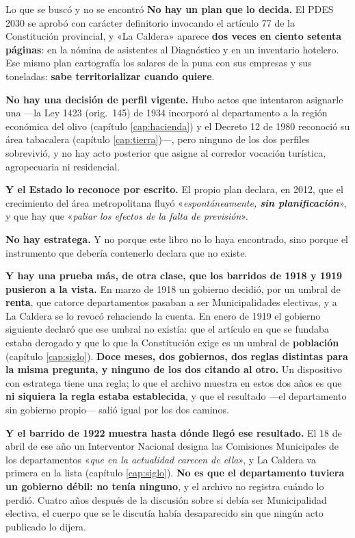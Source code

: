 \begin{ficha}{Lo que se buscó y no se encontró}
\textbf{No hay un plan que lo decida.} El PDES 2030 se aprobó con carácter definitorio invocando el artículo 77 de la Constitución provincial, y «La Caldera» aparece \textbf{dos veces en ciento setenta páginas}: en la nómina de
asistentes al Diagnóstico y en un inventario hotelero. Ese mismo plan cartografía los salares de
la puna con sus empresas y sus toneladas: \textbf{sabe territorializar cuando quiere}.

\textbf{No hay una decisión de perfil vigente.} Hubo actos que intentaron asignarle una ---la Ley 1423 (orig.\ 145) de 1934 incorporó al departamento a la región económica del olivo (capítulo \ref{cap:hacienda}) y el Decreto 12 de 1980 reconoció su área tabacalera (capítulo \ref{cap:tierra})---, pero ninguno de los dos perfiles sobrevivió, y no hay acto posterior que asigne al corredor vocación turística, agropecuaria ni residencial.

\textbf{Y el Estado lo reconoce por escrito.} El propio plan declara, en 2012, que el
crecimiento del área metropolitana fluyó «\textit{espontáneamente, \textbf{sin
planificación}}», y que hay que «\textit{paliar los efectos de la falta de previsión}».
\end{ficha}

\textbf{No hay estratega.} Y no porque este libro no lo haya encontrado, sino porque el
instrumento que debería contenerlo declara que no existe.

\textbf{Y hay una prueba más, de otra clase, que los barridos de 1918 y 1919 pusieron a la vista.}
En marzo de 1918 un gobierno decidió, por un umbral de \textbf{renta}, que catorce departamentos
pasaban a ser Municipalidades electivas, y a La Caldera se lo revocó rehaciendo la cuenta. En
enero de 1919 el gobierno siguiente declaró que ese umbral no existía: que el artículo en que se
fundaba estaba derogado y que lo que la Constitución exige es un umbral de \textbf{población}
(capítulo \ref{cap:siglo}). \textbf{Doce meses, dos gobiernos, dos reglas distintas para la misma
pregunta, y ninguno de los dos citando al otro.} Un dispositivo con estratega tiene una regla; lo
que el archivo muestra en estos dos años es que \textbf{ni siquiera la regla estaba establecida},
y que el resultado ---el departamento sin gobierno propio--- salió igual por los dos caminos.

\textbf{Y el barrido de 1922 muestra hasta dónde llegó ese resultado.} El 18 de abril de ese año
un Interventor Nacional designa las Comisiones Municipales de los departamentos «\textit{que en
la actualidad carecen de ella}», y La Caldera va primera en la lista (capítulo
\ref{cap:siglo}). \textbf{No es que el departamento tuviera un gobierno débil: no tenía ninguno},
y el archivo no registra cuándo lo perdió. Cuatro años después de la discusión sobre si debía ser
Municipalidad electiva, el cuerpo que se le discutía había desaparecido sin que ningún acto
publicado lo dijera.

